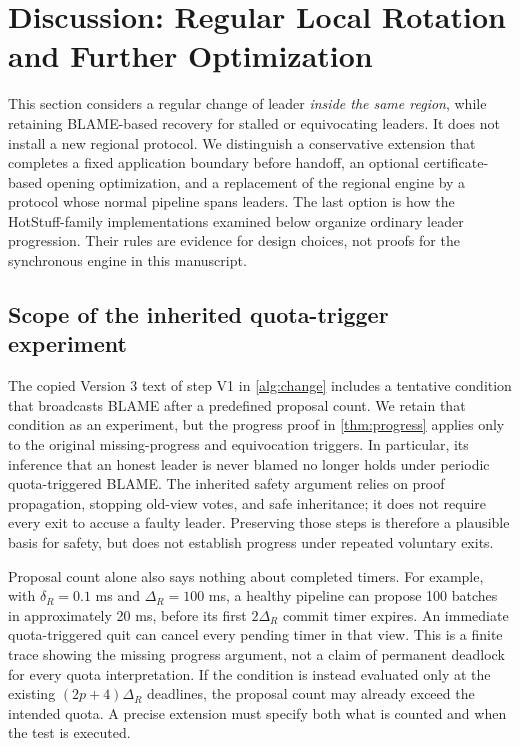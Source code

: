 \section{Discussion: Regular Local Rotation and Further Optimization}
\label{sec:rotation-discussion}

This section considers a regular change of leader \emph{inside the same
region}, while retaining BLAME-based recovery for stalled or equivocating
leaders. It does not install a new regional protocol. We distinguish a
conservative extension that completes a fixed application boundary before
handoff, an optional certificate-based opening optimization, and a replacement
of the regional engine by a protocol whose normal pipeline spans leaders.
The last option is how the HotStuff-family implementations examined below
organize ordinary leader progression. Their rules are evidence for design
choices, not proofs for the synchronous engine in this manuscript.

\subsection{Scope of the inherited quota-trigger experiment}
\label{sec:quota-experiment}
The copied Version 3 text of step V1 in \cref{alg:change} includes a tentative
condition that broadcasts BLAME after a predefined proposal count. We retain
that condition as an experiment, but the progress proof in
\cref{thm:progress} applies only to the original missing-progress and
equivocation triggers. In particular, its inference that an honest leader
is never blamed no longer holds under periodic quota-triggered BLAME.
The inherited safety argument relies on proof propagation, stopping old-view
votes, and safe inheritance; it does not require every exit to accuse a
faulty leader. Preserving those steps is therefore a plausible basis for
safety, but does not establish progress under repeated voluntary exits.

Proposal count alone also says nothing about completed timers. For example,
with $\delta_R=0.1$ ms and $\Delta_R=100$ ms, a healthy pipeline can propose
100 batches in approximately 20 ms, before its first $2\Delta_R$ commit
timer expires. An immediate quota-triggered quit can cancel every pending
timer in that view. This is a finite trace showing the missing progress
argument, not a claim of permanent deadlock for every quota interpretation.
If the condition is instead evaluated only at the existing
$(2p+4)\Delta_R$ deadlines, the proposal count may already exceed the
intended quota. A precise extension must specify both what is counted and
when the test is executed.

